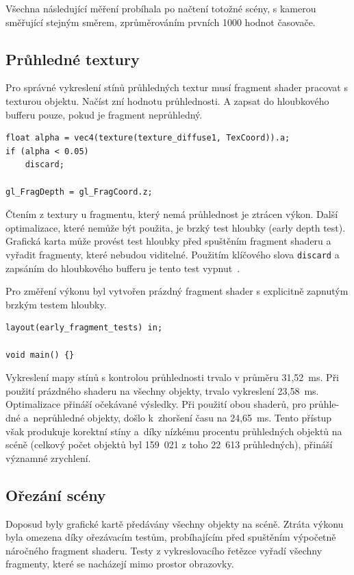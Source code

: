 \documentclass[thesis=M,czech]{FITthesis}[2019/12/23]
\begin{document}
Všechna následující měření probíhala po načtení totožné scény, s kamerou směřující stejným směrem, zprůměrováním prvních 1000 hodnot časovače.

\subsection{Průhledné textury}

Pro správné vykreslení stínů průhledných textur musí fragment shader pracovat s texturou objektu. Načíst zní hodnotu průhlednosti. A zapsat do hloubkového bufferu pouze, pokud je fragment neprůhledný.

\begin{verbatim}
float alpha = vec4(texture(texture_diffuse1, TexCoord)).a;
if (alpha < 0.05)
    discard;

gl_FragDepth = gl_FragCoord.z;
\end{verbatim}

Čtením z textury u fragmentu, který nemá průhlednost je ztrácen výkon. Další optimalizace, které nemůže být použita, je brzký test hloubky (early depth test). Grafická karta může provést test hloubky před spuštěním fragment shaderu a vyřadit fragmenty, které nebudou viditelné. Použitím klíčového slova \texttt{discard} a zapsáním do hloubkového bufferu je tento test vypnut~\cite{kronos_eft}.

Pro změření výkonu byl vytvořen prázdný fragment shader s explicitně zapnutým brzkým testem hloubky.

\begin{verbatim}
layout(early_fragment_tests) in;

void main() {}
\end{verbatim}

Vykreslení mapy stínů s kontrolou průhlednosti trvalo v průměru 31,52~ms. Při použití prázdného shaderu na všechny objekty, trvalo vykreslení 23,58~ms. Optimalizace přináší očekávané výsledky. Při použití obou shaderů, pro průhle-dné a~neprůhledné objekty, došlo k~zhoršení času na 24,65~ms. Tento přístup však produkuje korektní stíny a~díky nízkému procentu průhledných objektů na scéně (celkový počet objektů byl 159~021 z toho 22~613 průhledných), přináší významné zrychlení. 

\subsection{Ořezání scény}

Doposud byly grafické kartě předávány všechny objekty na scéně. Ztráta výkonu byla omezena díky ořezávacím testům, probíhajícím před spuštěním výpočetně náročného fragment shaderu. Testy z vykreslovacího řetězce vyřadí všechny fragmenty, které se nacházejí mimo prostor obrazovky.
\end{document}
